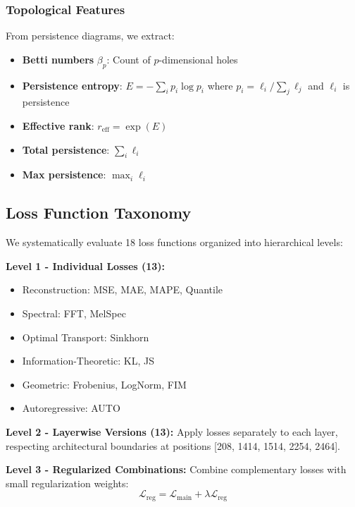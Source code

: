 \subsubsection{Topological Features}

From persistence diagrams, we extract:
\begin{itemize}
    \item \textbf{Betti numbers} $\beta_p$: Count of $p$-dimensional holes
    \item \textbf{Persistence entropy}: $E = -\sum_i p_i \log p_i$ where $p_i = \ell_i / \sum_j \ell_j$ and $\ell_i$ is persistence
    \item \textbf{Effective rank}: $r_{\text{eff}} = \exp(E)$
    \item \textbf{Total persistence}: $\sum_i \ell_i$
    \item \textbf{Max persistence}: $\max_i \ell_i$
\end{itemize}

\subsection{Loss Function Taxonomy}

We systematically evaluate 18 loss functions organized into hierarchical levels:

\textbf{Level 1 - Individual Losses (13):}
\begin{itemize}
    \item Reconstruction: MSE, MAE, MAPE, Quantile
    \item Spectral: FFT, MelSpec
    \item Optimal Transport: Sinkhorn
    \item Information-Theoretic: KL, JS
    \item Geometric: Frobenius, LogNorm, FIM
    \item Autoregressive: AUTO
\end{itemize}

\textbf{Level 2 - Layerwise Versions (13):}
Apply losses separately to each layer, respecting architectural boundaries at positions [208, 1414, 1514, 2254, 2464].

\textbf{Level 3 - Regularized Combinations:}
Combine complementary losses with small regularization weights:
\begin{equation}
\mathcal{L}_{\text{reg}} = \mathcal{L}_{\text{main}} + \lambda \mathcal{L}_{\text{reg}}
\label{eq:regularized}
\end{equation}

